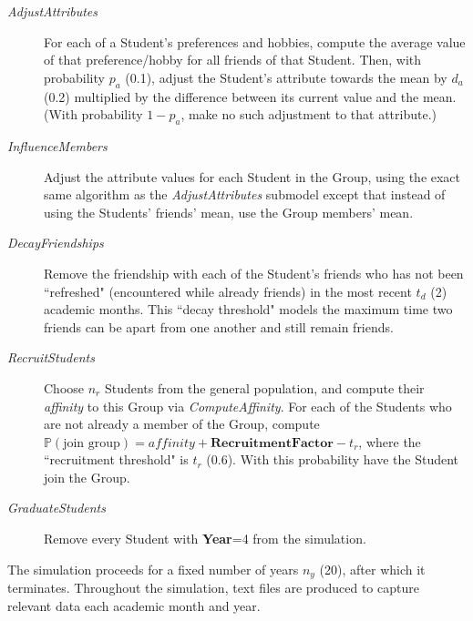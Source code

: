 \begin{description}
\item[\textsl{AdjustAttributes}] For each of a Student's preferences and
hobbies, compute the average value of that preference/hobby for all friends of
that Student. Then, with probability $p_a$ (0.1), adjust the Student's
attribute towards the mean by $d_a$ (0.2) multiplied by the difference between its current
value and the mean. (With probability $1-p_a$, make no such adjustment to that
attribute.)

\item[\textsl{InfluenceMembers}] Adjust the attribute values for each Student
in the Group, using the exact same algorithm as the \textsl{AdjustAttributes}
submodel except that instead of using the Students' friends' mean, use the
Group members' mean.

\item[\textsl{DecayFriendships}] Remove the friendship with each of the
Student's friends who has not been ``refreshed" (encountered while already
friends) in the most recent $t_d$ (2) academic months. This ``decay threshold"
models the maximum time two friends can be apart from one another and still
remain friends.

\item[\textsl{RecruitStudents}] Choose $n_r$ Students from the general
population, and compute their \textit{affinity} to this Group via
\textsl{ComputeAffinity}. For each of the Students who are not already a
member of the Group, compute $\mathbb{P}(\text{join group})= \textit{affinity}
+ \textbf{RecruitmentFactor} - t_r$, where the ``recruitment threshold" is $t_r$ (0.6). 
With this probability have the Student join the Group.

\item[\textsl{GraduateStudents}] Remove every Student with \textbf{Year}=4 from the
simulation.

\end{description}

The simulation proceeds for a fixed number of years $n_y$ (20), after which it terminates.
Throughout the simulation, text files are produced to capture relevant data
each academic month and year.

